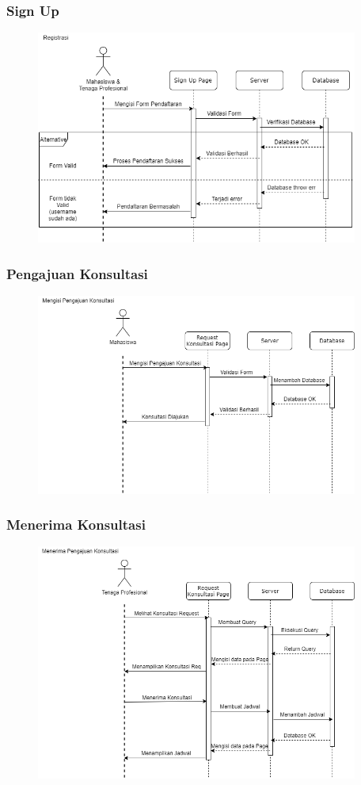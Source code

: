 \documentclass{article}
\begin{document}
	\subsubsection{Sign Up}
	\begin{figure}[H]
		\centering
		\includegraphics[width=400px]{seq Sign Up.png}
	\end{figure}

	\subsubsection{Pengajuan Konsultasi}
	\begin{figure}[H]
		\centering
		\includegraphics[width=400px]{seq Mengajukan Konsultasi.png}
	\end{figure}

	\subsubsection{Menerima Konsultasi}
	\begin{figure}[H]
		\centering
		\includegraphics[width=400px]{seq Menerima Konsultasi (1).png}
	\end{figure}
\end{document}
